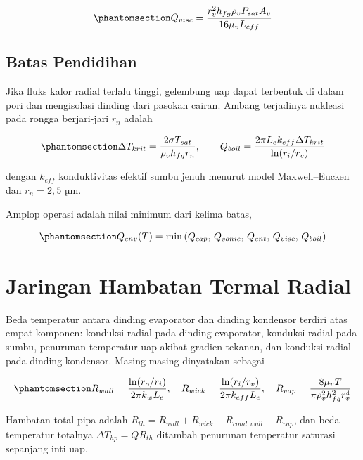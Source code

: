 \documentclass[
  indonesian,
  12pt,
  a4paper,
]{report}
\begin{document}
\begin{equation}\protect\phantomsection\label{eq-visc}{Q_{visc} = \frac{r_v^{2} h_{fg} \rho_v P_{sat} A_v}{16 \mu_v L_{eff}}}\end{equation}

\subsection{Batas Pendidihan}\label{batas-pendidihan}

Jika fluks kalor radial terlalu tinggi, gelembung uap dapat terbentuk di
dalam pori dan mengisolasi dinding dari pasokan cairan. Ambang
terjadinya nukleasi pada rongga berjari-jari \(r_n\) adalah

\begin{equation}\protect\phantomsection\label{eq-boil}{\Delta T_{krit} = \frac{2 \sigma T_{sat}}{\rho_v h_{fg} r_n}, \qquad
Q_{boil} = \frac{2 \pi L_e k_{eff} \Delta T_{krit}}{\ln(r_i/r_v)}}\end{equation}

dengan \(k_{eff}\) konduktivitas efektif sumbu jenuh menurut model
Maxwell--Eucken dan \(r_n = 2{,}5\) µm.

Amplop operasi adalah nilai minimum dari kelima batas,

\begin{equation}\protect\phantomsection\label{eq-env}{Q_{env}(T) = \min\left(Q_{cap},\, Q_{sonic},\, Q_{ent},\, Q_{visc},\, Q_{boil}\right)}\end{equation}

\section{Jaringan Hambatan Termal
Radial}\label{jaringan-hambatan-termal-radial}

Beda temperatur antara dinding evaporator dan dinding kondensor terdiri
atas empat komponen: konduksi radial pada dinding evaporator, konduksi
radial pada sumbu, penurunan temperatur uap akibat gradien tekanan, dan
konduksi radial pada dinding kondensor. Masing-masing dinyatakan sebagai

\begin{equation}\protect\phantomsection\label{eq-rth}{R_{wall} = \frac{\ln(r_o/r_i)}{2\pi k_w L_e}, \quad
R_{wick} = \frac{\ln(r_i/r_v)}{2\pi k_{eff} L_e}, \quad
R_{vap} = \frac{8 \mu_v T}{\pi \rho_v^{2} h_{fg}^{2} r_v^{4}}}\end{equation}

Hambatan total pipa adalah
\(R_{th} = R_{wall} + R_{wick} + R_{cond,wall} + R_{vap}\), dan beda
temperatur totalnya \(\Delta T_{hp} = Q R_{th}\) ditambah penurunan
temperatur saturasi sepanjang inti uap.
\end{document}
